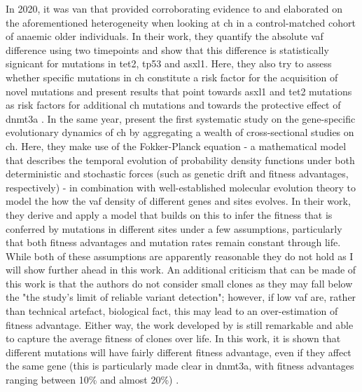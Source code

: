 In 2020, it was van  that provided corroborating evidence to and elaborated on the aforementioned heterogeneity when looking at \ac{ch} in a control-matched cohort of anaemic older individuals. In their work, they quantify the absolute \ac{vaf} difference using two timepoints and show that this difference is statistically signicant for mutations in \ac{tet2}, \ac{tp53} and \ac{asxl1}. Here, they also try to assess whether specific mutations in \ac{ch} constitute a risk factor for the acquisition of novel mutations and present results that point towards \ac{asxl1} and \ac{tet2} mutations as risk factors for additional \ac{ch} mutations and towards the protective effect of \ac{dnmt3a} \cite{Van_Zeventer2020-pw}. In the same year,  present the first systematic study on the gene-specific evolutionary dynamics of \ac{ch} by aggregating a wealth of cross-sectional studies on \ac{ch}. Here, they make use of the Fokker-Planck equation - a mathematical model that describes the temporal evolution of probability density functions under both deterministic and stochastic forces (such as genetic drift and fitness advantages, respectively) - in combination with well-established molecular evolution theory to model the how the \ac{vaf} density of different genes and sites evolves. In their work, they derive and apply a model that builds on this to infer the fitness that is conferred by mutations in different sites under a few assumptions, particularly that both fitness advantages and mutation rates remain constant through life. While both of these assumptions are apparently reasonable they do not hold as I will show further ahead in this work. An additional criticism that can be made of this work is that the authors do not consider small clones as they may fall below the "the study's limit of reliable variant detection"; however, if low \ac{vaf} are, rather than technical artefact, biological fact, this may lead to an over-estimation of fitness advantage. Either way, the work developed by  is still remarkable and able to capture the average fitness of clones over life. In this work, it is shown that different mutations will have fairly different fitness advantage, even if they affect the same gene (this is particularly made clear in \ac{dnmt3a}, with fitness advantages ranging between 10\% and almost 20\%) \cite{Watson2020-pz}.

